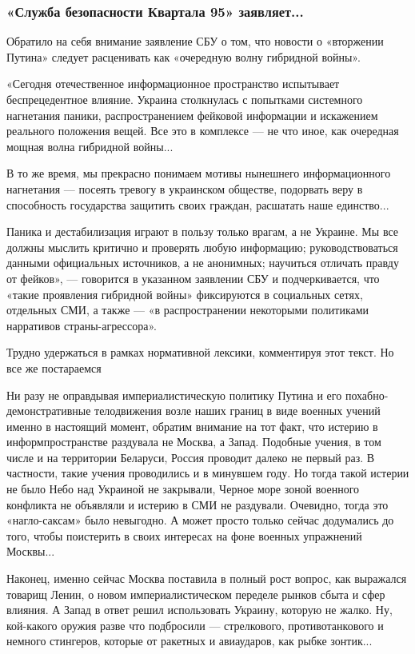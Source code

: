  
 
 
 
 

\subsubsection{«Служба безопасности Квартала 95» заявляет...}

Обратило на себя внимание заявление СБУ о том, что новости о «вторжении Путина»
следует расценивать как «очередную волну гибридной войны».

«Сегодня отечественное информационное пространство испытывает беспрецедентное
влияние. Украина столкнулась с попытками системного нагнетания паники,
распространением фейковой информации и искажением реального положения вещей.
Все это в комплексе — не что иное, как очередная мощная волна гибридной
войны...

В то же время, мы прекрасно понимаем мотивы нынешнего информационного
нагнетания — посеять тревогу в украинском обществе, подорвать веру в
способность государства защитить своих граждан, расшатать наше единство...

Паника и дестабилизация играют в пользу только врагам, а не Украине. Мы все
должны мыслить критично и проверять любую информацию; руководствоваться данными
официальных источников, а не анонимных; научиться отличать правду от фейков», —
говорится в указанном заявлении СБУ и подчеркивается, что «такие проявления
гибридной войны» фиксируются в социальных сетях, отдельных СМИ, а также — «в
распространении некоторыми политиками нарративов страны-агрессора».

Трудно удержаться в рамках нормативной лексики, комментируя этот текст. Но все
же постараемся

Ни разу не оправдывая империалистическую политику Путина и его
похабно-демонстративные телодвижения возле наших границ в виде военных учений
именно в настоящий момент, обратим внимание на тот факт, что истерию в
информпространстве раздувала не Москва, а Запад. Подобные учения, в том числе и
на территории Беларуси, Россия проводит далеко не первый раз. В частности,
такие учения проводились и в минувшем году. Но тогда такой истерии не было Небо
над Украиной не закрывали, Черное море зоной военного конфликта не объявляли и
истерию в СМИ не раздували. Очевидно, тогда это «нагло-саксам» было невыгодно.
А может просто только сейчас додумались до того, чтобы поистерить в своих
интересах на фоне военных упражнений Москвы...

Наконец, именно сейчас Москва поставила в полный рост вопрос, как выражался
товарищ Ленин, о новом империалистическом переделе рынков сбыта и сфер влияния.
А Запад в ответ решил использовать Украину, которую не жалко. Ну, кой-какого
оружия разве что подбросили — стрелкового, противотанкового и немного
стингеров, которые от ракетных и авиаударов, как рыбке зонтик...

